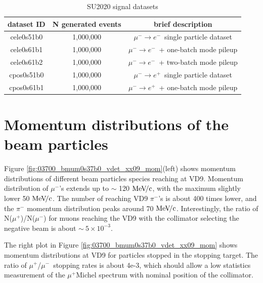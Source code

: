 \documentclass[12pt]{article}
\newcommand {\MeVc}       {\mbox{$\rm MeV\!/c$}}
\newcommand {\muminus}    {\mbox{$\mu^-$}}
\newcommand {\muplus}    {\mbox{$\mu^+$}}
\newcommand {\MuToEm}     {\mbox{$\mu^- \ra e^-$}}
\newcommand {\MuToEp}     {\mbox{$\mu^- \ra e^+$}}
\newcommand {\ra}        {\rightarrow}
\begin{document}
\begin{table}[H]
  { \renewcommand{\arraystretch}{1.0}   %
    \begin{center}
      \begin{tabular}{|c|c|c|}
        \hline
        dataset ID   & N generated events  &  brief description                  \\
        \hline
        cele0s51b0   &  1,000,000          &  \MuToEm\  single particle dataset  \\
        cele0s61b1   &  1,000,000          &  \MuToEm\  + one-batch mode pileup    \\
        cele0s61b2   &  1,000,000          &  \MuToEm\  + two-batch mode pileup    \\
        \hline
        cpos0s51b0   &  1,000,000          &  \MuToEp\  single particle dataset  \\
        cpos0s61b1   &  1,000,000          &  \MuToEp\  + one-batch mode pileup    \\
        \hline
      \end{tabular}
    \end{center}
  }
  \caption{
    \label{tab:datasets}
    SU2020 signal datasets
  }
\end{table}

\section {Momentum distributions of the beam particles }

Figure \ref{fig:03700_bmum0s37b0_vdet_xx09_mom}(left) shows momentum distributions
of different beam particles species reaching at VD9. Momentum distribution of \muminus's
extends up to $\sim$ 120 \MeVc, with the maximum slightly lower 50 \MeVc.
The number of reaching VD9 $\pi^-$'s is about 400 times lower, and the $\pi^-$ momentum
distribution peaks around 70 \MeVc. Interestingly, the ratio of N(\muplus)/N(\muminus)
for muons reaching the VD9 with the collimator selecting the negative beam
is about $\sim ~ 5 \times 10^{-3}$.

The right plot in Figure \ref{fig:03700_bmum0s37b0_vdet_xx09_mom} shows momentum distributions
at VD9 for particles stopped in the stopping target. The ratio of \muplus/\muminus\ stopping rates
is about 4e-3, which should allow a low statistics measurement of the \muplus Michel spectrum with
nominal position of the collimator.
\end{document}
